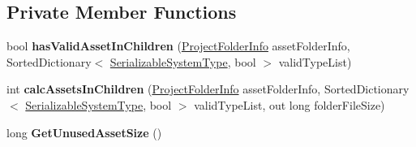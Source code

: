 \subsection*{Private Member Functions}
\begin{DoxyCompactItemize}
\item 
\mbox{\label{class_heureka_games_1_1_project_folder_info_a3f056fd922ae6bf4ad5c06a11ed96913}} 
bool {\bfseries has\+Valid\+Asset\+In\+Children} (\hyperlink{class_heureka_games_1_1_project_folder_info}{Project\+Folder\+Info} asset\+Folder\+Info, Sorted\+Dictionary$<$ \hyperlink{class_heureka_games_1_1_serializable_system_type}{Serializable\+System\+Type}, bool $>$ valid\+Type\+List)
\item 
\mbox{\label{class_heureka_games_1_1_project_folder_info_a7dc2e07e124c1fa14a950d6332ca244a}} 
int {\bfseries calc\+Assets\+In\+Children} (\hyperlink{class_heureka_games_1_1_project_folder_info}{Project\+Folder\+Info} asset\+Folder\+Info, Sorted\+Dictionary$<$ \hyperlink{class_heureka_games_1_1_serializable_system_type}{Serializable\+System\+Type}, bool $>$ valid\+Type\+List, out long folder\+File\+Size)
\item 
\mbox{\label{class_heureka_games_1_1_project_folder_info_ad34c12a92105e4b112d1914a57213929}} 
long {\bfseries Get\+Unused\+Asset\+Size} ()
\end{DoxyCompactItemize}
